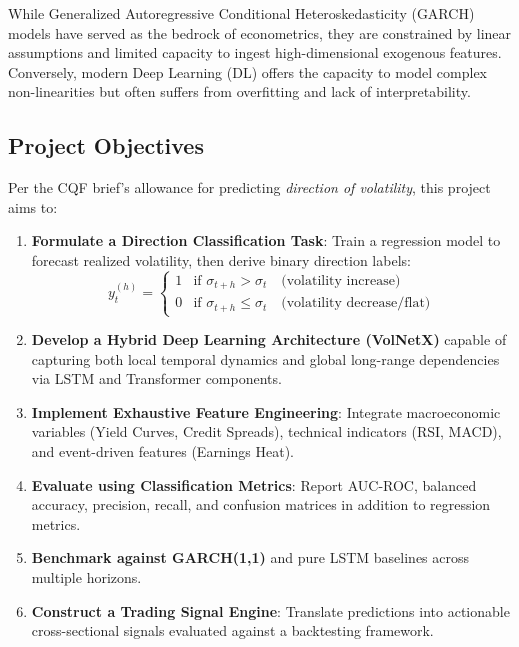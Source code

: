 \documentclass[11pt, a4paper]{article}
\begin{document}
While Generalized Autoregressive Conditional Heteroskedasticity (GARCH) models \cite{engle1982} have served as the bedrock of econometrics, they are constrained by linear assumptions and limited capacity to ingest high-dimensional exogenous features. Conversely, modern Deep Learning (DL) offers the capacity to model complex non-linearities but often suffers from overfitting and lack of interpretability.

\subsection{Project Objectives}
Per the CQF brief's allowance for predicting \textit{direction of volatility}, 
this project aims to:
\begin{enumerate}
    \item \textbf{Formulate a Direction Classification Task}: Train a regression 
    model to forecast realized volatility, then derive binary direction labels:
    \begin{equation}
        y_t^{(h)} = 
        \begin{cases}
            1 & \text{if } \sigma_{t+h} > \sigma_{t} \quad \text{(volatility increase)} \\
            0 & \text{if } \sigma_{t+h} \leq \sigma_{t} \quad \text{(volatility decrease/flat)}
        \end{cases}
    \end{equation}
    
    \item \textbf{Develop a Hybrid Deep Learning Architecture (VolNetX)} capable 
    of capturing both local temporal dynamics and global long-range dependencies 
    via LSTM and Transformer components.
    
    \item \textbf{Implement Exhaustive Feature Engineering}: Integrate 
    macroeconomic variables (Yield Curves, Credit Spreads), technical indicators 
    (RSI, MACD), and event-driven features (Earnings Heat).
    
    \item \textbf{Evaluate using Classification Metrics}: Report AUC-ROC, 
    balanced accuracy, precision, recall, and confusion matrices in addition 
    to regression metrics.
    
    \item \textbf{Benchmark against GARCH(1,1)} and pure LSTM baselines across 
    multiple horizons.
    
    \item \textbf{Construct a Trading Signal Engine}: Translate predictions into 
    actionable cross-sectional signals evaluated against a backtesting framework.
\end{enumerate}
\end{document}
